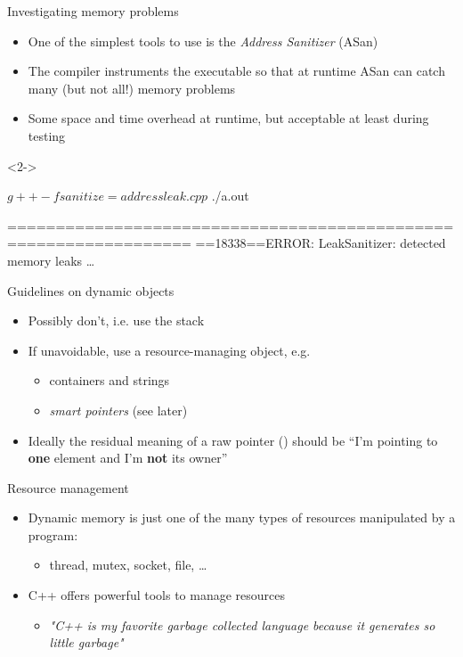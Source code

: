\begin{frame}[fragile]{Investigating memory problems}

  \begin{itemize}
  \item One of the simplest tools to use is the \textit{Address Sanitizer}
    (ASan)
  \item The compiler instruments the executable so that at runtime ASan can
    catch many (but not all!) memory problems
  \item Some space and time overhead at runtime, but acceptable at least during
    testing
  \end{itemize}

    \begin{shellblock}<2->{
$ g++ -fsanitize=address leak.cpp
$ ./a.out

=================================================================
==18338==ERROR: LeakSanitizer: detected memory leaks
\ldots}\end{shellblock}

\end{frame}

\begin{frame}{Guidelines on dynamic objects}

  \begin{itemize}
  \item Possibly don't, i.e. use the stack
  \item If unavoidable, use a resource-managing object, e.g.
    \begin{itemize}
    \item containers and strings
    \item \textit{smart pointers} (see later)
    \end{itemize}
  \item Ideally the residual meaning of a raw pointer () should be
    ``I'm pointing to \textbf{one} element and I'm \textbf{not} its owner''
  \end{itemize}
\end{frame}

\begin{frame}{Resource management}
  \begin{itemize}
  \item<1-> Dynamic memory is just one of the many types of resources manipulated by a
    program:
    \begin{itemize}
    \item thread, mutex, socket, file, \ldots
    \end{itemize}
  \item<2-> C++ offers powerful tools to manage resources
    \begin{itemize}
    \item \textit{"C++ is my favorite garbage collected language because it
      generates so little garbage"}
    \end{itemize}
  \end{itemize}

\end{frame}

